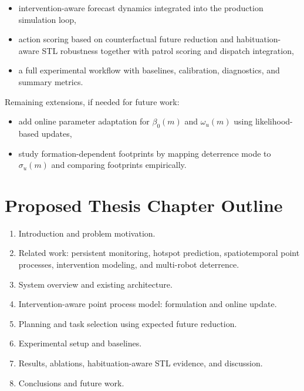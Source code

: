 \begin{itemize}
\item intervention-aware forecast dynamics integrated into the production simulation loop,
\item action scoring based on counterfactual future reduction and habituation-aware STL robustness together with patrol scoring and dispatch integration,
\item a full experimental workflow with baselines, calibration, diagnostics, and summary metrics.
\end{itemize}

Remaining extensions, if needed for future work:

\begin{itemize}
\item add online parameter adaptation for $\beta_0(m)$ and $\omega_u(m)$ using likelihood-based updates,
\item study formation-dependent footprints by mapping deterrence mode to $\sigma_u(m)$ and comparing footprints empirically.
\end{itemize}

\section{Proposed Thesis Chapter Outline}

\begin{enumerate}
\item Introduction and problem motivation.
\item Related work: persistent monitoring, hotspot prediction, spatiotemporal point processes, intervention modeling, and multi-robot deterrence.
\item System overview and existing architecture.
\item Intervention-aware point process model: formulation and online update.
\item Planning and task selection using expected future reduction.
\item Experimental setup and baselines.
\item Results, ablations, habituation-aware STL evidence, and discussion.
\item Conclusions and future work.
\end{enumerate}
